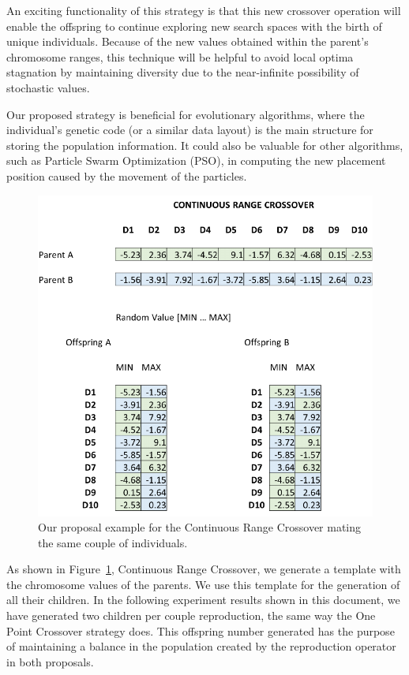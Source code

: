 \documentclass[graybox]{svmult}
\begin{document}
    An exciting functionality of this strategy is that this new crossover operation will enable the offspring to continue exploring new search spaces with the birth of unique individuals. Because of the new values obtained within the parent's chromosome ranges, this technique will be helpful to avoid local optima stagnation by maintaining diversity due to the near-infinite possibility of stochastic values.

    Our proposed strategy is beneficial for evolutionary algorithms, where the individual's genetic code (or a similar data layout) is the main structure for storing the population information. It could also be valuable for other algorithms, such as Particle Swarm Optimization (PSO), in computing the new placement position caused by the movement of the particles.

    \begin{figure}[!ht]
        \centering
        \includegraphics[width=0.90\linewidth]{img/fig_contrange_crossover.pdf}
        \caption{Our proposal example for the Continuous Range Crossover mating the same couple of individuals.} \label{fig.contrange_crossover}
        \end{figure}        
    
    \FloatBarrier

    As shown in Figure~\ref{fig.contrange_crossover}, Continuous Range Crossover, we generate a template with the chromosome values of the parents. We use this template for the generation of all their children. In the following experiment results shown in this document, we have generated two children per couple reproduction, the same way the One Point Crossover strategy does. This offspring number generated has the purpose of maintaining a balance in the population created by the reproduction operator in both proposals.
\end{document}
